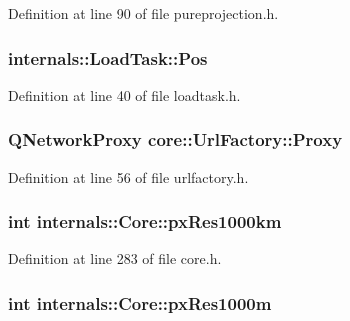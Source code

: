 \-Definition at line 90 of file pureprojection.\-h.

\hypertarget{group___o_p_map_widget_gaaaf77679e16ef9213c85fbfaff467339}{
\subsubsection[{\-Pos}]{ {\bf internals\-::\-Load\-Task\-::\-Pos}}}\label{group___o_p_map_widget_gaaaf77679e16ef9213c85fbfaff467339}


\-Definition at line 40 of file loadtask.\-h.

\hypertarget{group___o_p_map_widget_ga4851a6205d1885048a3417f736ec8679}{
\subsubsection[{\-Proxy}]{\setlength{\rightskip}{0pt plus 5cm}\-Q\-Network\-Proxy {\bf core\-::\-Url\-Factory\-::\-Proxy}}}\label{group___o_p_map_widget_ga4851a6205d1885048a3417f736ec8679}


\-Definition at line 56 of file urlfactory.\-h.

\hypertarget{group___o_p_map_widget_ga5abde0bbaaa9517978da18398333e69b}{
\subsubsection[{px\-Res1000km}]{\setlength{\rightskip}{0pt plus 5cm}int {\bf internals\-::\-Core\-::px\-Res1000km}}}\label{group___o_p_map_widget_ga5abde0bbaaa9517978da18398333e69b}


\-Definition at line 283 of file core.\-h.

\hypertarget{group___o_p_map_widget_gaa0947582a08d181d668db653fa4ed991}{
\subsubsection[{px\-Res1000m}]{\setlength{\rightskip}{0pt plus 5cm}int {\bf internals\-::\-Core\-::px\-Res1000m}}}\label{group___o_p_map_widget_gaa0947582a08d181d668db653fa4ed991}


